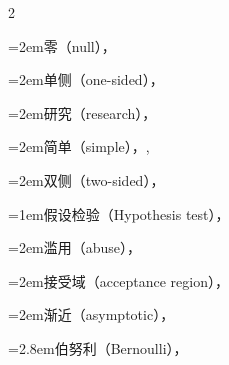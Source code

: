 \begin{multicols}{2}
\par\noindent\hangindent=2em\hspace*{1em}\label{idx:477}零（null），\hyperref[def:8.1.2]{\pageref*{def:8.1.2}}\par
\par\noindent\hangindent=2em\hspace*{1em}\label{idx:478}单侧（one-sided），\hyperref[idxocc:478:348]{\pageref*{idxocc:478:348}}\par
\par\noindent\hangindent=2em\hspace*{1em}\label{idx:479}研究（research），\hyperref[idxocc:479:344]{\pageref*{idxocc:479:344}}\par
\par\noindent\hangindent=2em\hspace*{1em}\label{idx:480}简单（simple），\hyperref[idxocc:480:345]{\pageref*{idxocc:480:345}}, \hyperref[idxocc:480:348]{\pageref*{idxocc:480:348}}\par
\par\noindent\hangindent=2em\hspace*{1em}\label{idx:481}双侧（two-sided），\hyperref[idxocc:481:348]{\pageref*{idxocc:481:348}}\par
\par\addvspace{2pt}
\par\noindent\hangindent=1em\hspace*{0em}\label{idx:482}假设检验（Hypothesis test），\hyperref[def:8.1.3]{\pageref*{def:8.1.3}}\par
\par\noindent\hangindent=2em\hspace*{1em}\label{idx:483}滥用（abuse），\hyperref[exercise:8.16]{\pageref*{exercise:8.16}}\par
\par\noindent\hangindent=2em\hspace*{1em}\label{idx:484}接受域（acceptance region），\hyperref[idxocc:484:333]{\pageref*{idxocc:484:333}}\par
\par\noindent\hangindent=2em\hspace*{1em}\label{idx:485}渐近（asymptotic），\hyperref[exercise:10.32]{\pageref*{exercise:10.32}}\par
\par\noindent\hangindent=2.8em\hspace*{1.8em}\label{idx:486}伯努利（Bernoulli），\hyperref[ex:10.3.5]{\pageref*{ex:10.3.5}}\par

\end{multicols}
